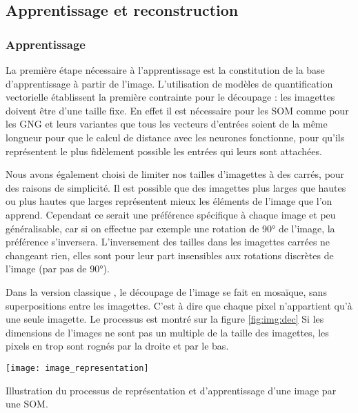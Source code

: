 
	\subsection{Apprentissage et reconstruction}\label{sec:img:compression}
	\subsubsection{Apprentissage}
	La première étape nécessaire à l'apprentissage est la constitution de la base d'apprentissage à partir de l'image. L'utilisation de modèles de quantification vectorielle établissent la première contrainte pour le découpage : les imagettes doivent être d'une taille fixe. En effet il est nécessaire pour les SOM comme pour les GNG et leurs variantes que tous les vecteurs d'entrées soient de la même longueur pour que le calcul de distance avec les neurones fonctionne, pour qu'ils représentent le plus fidèlement possible les entrées qui leurs sont attachées.

	Nous avons également choisi de limiter nos tailles d'imagettes à des carrés, pour des raisons de simplicité. Il est possible que des imagettes plus larges que hautes ou plus hautes que larges représentent mieux les éléments de l'image que l'on apprend. Cependant ce serait une préférence spécifique à chaque image et peu généralisable, car si on effectue par exemple une rotation de 90° de l'image, la préférence s'inversera. L'inversement des tailles dans les imagettes carrées ne changeant rien, elles sont pour leur part insensibles aux rotations discrètes de l'image (par pas de 90°).

	Dans la version classique \cite{amerijckx-compression}, le découpage de l'image se fait en mosaïque, sans superpositions entre les imagettes. C'est à dire que chaque pixel n'appartient qu'à une seule imagette. Le processus est montré sur la figure \ref{fig:img:dec} Si les dimensions de l'images ne sont pas un multiple de la taille des imagettes, les pixels en trop sont rognés par la droite et par le bas.

	\begin{figureth}
		\texttt{[image: image\_representation]}
		\caption[Représentation d'une image]{Illustration du processus de représentation et d'apprentissage d'une image par une SOM.}\label{fig:img:dec}
	\end{figureth}

